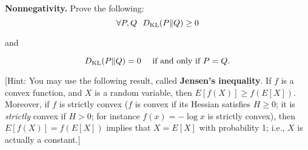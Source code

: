 \item{}
\textbf{Nonnegativity.}
Prove the following:
$$\forall P, Q  \ \ D_{\text{KL}}(P\|Q) \geq 0$$

and

\[
D_{\text{KL}}(P\|Q) = 0 \ \ \ \mbox{ if and only if } P=Q.
\]

[Hint: You may use the following result, called {\bf Jensen's
inequality}.  If $f$ is a convex function, and $X$ is a random
variable, then $E[f(X)] \geq f(E[X])$. Moreover, if $f$ is strictly
convex ($f$ is convex if its Hessian satisfies $H \geq 0$; it is
\emph{strictly} convex if $H > 0$; for instance $f(x) = -\log x$ is
strictly convex), then $E[f(X)] = f(E[X])$ implies that $X=E[X]$
with probability 1; i.e., $X$ is actually a constant.] \\


\ifnum{} {
  
} \fi
